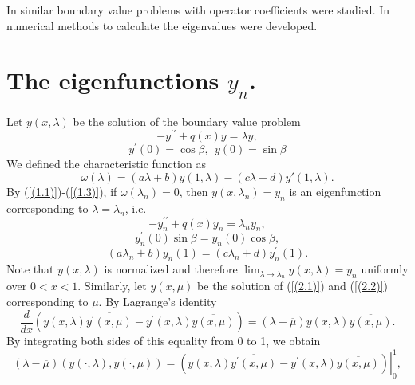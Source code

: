 \documentclass[10pt,a4paper]{amsart}
\numberwithin{equation}{section}
\begin{document}
In \cite{aslanova, aslanova1} similar boundary value problems with operator coefficients were studied. In \cite{chein, liu} numerical methods  to calculate the eigenvalues were developed. 

\section{The eigenfunctions $y_{n}$.}\label{sec2}

Let $y(x,\lambda)$ be the solution of the boundary value problem  
\begin{equation}
-y^{\prime \prime }+q(x)y=\lambda y,  \label{(2.1)}
\end{equation}
\begin{equation}
y^{\prime }(0)=\cos \beta ,\ \   y(0)=\sin \beta \label{(2.2)}
\end{equation}
We defined the characteristic function as 
\begin{equation}
\omega(\lambda) = (a\lambda + b)y(1,\lambda) - (c\lambda + d)y{'}(1,\lambda).\label{(2.3)}
\end{equation}
By (\ref{(1.1)})-(\ref{(1.3)}), if \(\omega(\lambda_n)=0\), then $y(x,\lambda_n)=y_{n}$ is an eigenfunction corresponding to $\lambda=\lambda_n$, i.e.
\begin{equation}
-y_{n}^{\prime \prime }+q(x)y_{n}=\lambda _{n}y_{n},  \label{(2.4)}
\end{equation}
\begin{equation}
y_{n}^{\prime }(0)\sin \beta =y_{n}(0)\cos \beta ,  \label{(2.5)}
\end{equation}
\begin{equation}
(a\lambda _{n}+b)y_{n}(1)=(c\lambda _{n}+d)y^{\prime }_{n}(1).  \label{(2.6)}
\end{equation}
Note that  $y(x,\lambda)$ is normalized and therefore    $\lim_{\lambda \to \lambda_n}y(x,\lambda)=y_n$ uniformly over $0<x<1$. Similarly, let $y(x,\mu)$ be the solution of (\ref{(2.1)}) and (\ref{(2.2)}) corresponding to $\mu$. 
By Lagrange's identity
$$
\frac{d}{dx}(y(x,\lambda)\overline{y^{\prime }(x,\mu)}-y^{\prime
}(x,\lambda)\overline{y(x,\mu)})= (\lambda - \overline
{\mu})y(x,\lambda)\overline{y(x,\mu)}.
$$
By integrating both sides of this equality from 0 to 1, we obtain
\begin{equation}
(\lambda - \overline
{\mu})\left(y(\cdot,\lambda),y(\cdot,\mu)\right)={\left. {(y(x,\lambda)\overline{y^{\prime }(x,\mu)}-y^{\prime
}(x,\lambda)\overline{y(x,\mu)}) } \right|}_{0}^{1},
\label{(2.7)} \end{equation}
\end{document}
